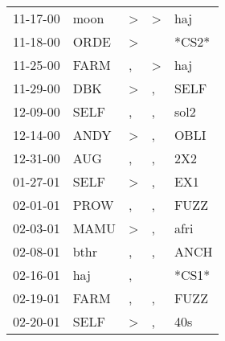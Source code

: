 \begin{supertabular}{p{0.07\textwidth}p{0.06\textwidth}p{0.02\textwidth}p{0.02\textwidth}p{0.06\textwidth}}
          11-17-00\textsuperscript{} &           moon\textsuperscript{} &     \textgreater &     \textgreater &            haj\textsuperscript{} \\
          11-18-00\textsuperscript{} &           ORDE\textsuperscript{} &     \textgreater &                  &                            *CS2* \\
          11-25-00\textsuperscript{} &           FARM\textsuperscript{} &                , &     \textgreater &            haj\textsuperscript{} \\
          11-29-00\textsuperscript{} &            DBK\textsuperscript{} &     \textgreater &                , &           SELF\textsuperscript{} \\
          12-09-00\textsuperscript{} &           SELF\textsuperscript{} &                , &                , &           sol2\textsuperscript{} \\
          12-14-00\textsuperscript{} &           ANDY\textsuperscript{} &     \textgreater &                , &           OBLI\textsuperscript{} \\
          12-31-00\textsuperscript{} &            AUG\textsuperscript{} &                , &                , &            2X2\textsuperscript{} \\
          01-27-01\textsuperscript{} &           SELF\textsuperscript{} &     \textgreater &                , &            EX1\textsuperscript{} \\
          02-01-01\textsuperscript{} &           PROW\textsuperscript{} &                , &                , &           FUZZ\textsuperscript{} \\
          02-03-01\textsuperscript{} &           MAMU\textsuperscript{} &     \textgreater &                , &           afri\textsuperscript{} \\
          02-08-01\textsuperscript{} &           bthr\textsuperscript{} &                , &                , &           ANCH\textsuperscript{} \\
          02-16-01\textsuperscript{} &            haj\textsuperscript{} &                , &                  &                            *CS1* \\
          02-19-01\textsuperscript{} &           FARM\textsuperscript{} &                , &                , &           FUZZ\textsuperscript{} \\
          02-20-01\textsuperscript{} &           SELF\textsuperscript{} &     \textgreater &                , &            40s\textsuperscript{} \\

\end{supertabular}
